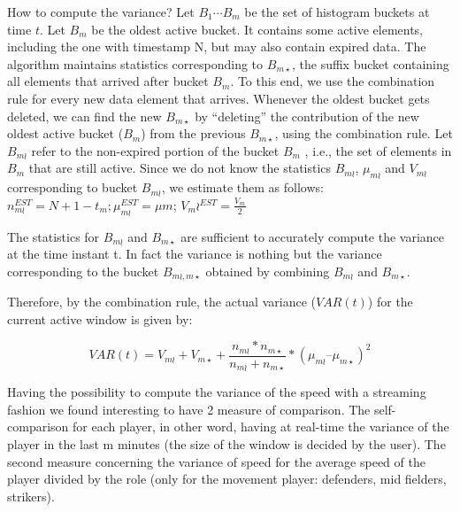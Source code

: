 \documentclass{acm_proc_article-sp-sigmod07}
\begin{document}
How to compute the variance? Let $B_1 \cdots B_m$ be the set of histogram buckets at time $t$. Let $B_m$ be the oldest active bucket. It contains some active elements, including the one with timestamp N, but may also contain expired data. The algorithm maintains statistics corresponding to $B_{m\star}$, the suffix bucket containing all elements that arrived after bucket $B_m$. To this end, we use the combination rule for every new data element that arrives. Whenever the oldest bucket gets deleted, we can find the new $B_{m\star}$ by “deleting” the contribution of the new oldest active bucket ($B_m$) from the previous $B_{m\star}$, using the combination rule. 
Let $B_{m\wr}$ refer to the non-expired portion of the bucket $B_m$ , i.e., the set of elements in $B_m$ that are still active. 
Since we do not know the statistics $B_{m\wr}$, $\mu_{m\wr}$  and $V_{m\wr}$ corresponding to bucket $B_{m\wr}$, we estimate them as follows: $n_{m\wr} ^{EST}= N + 1 - t_m; \mu_{m\wr} ^{EST} = \mu m $; $V_m{\wr} ^{EST} = \frac{V_m}{2}$ 

The statistics for $B_{m\wr}$ and $B_{m\star}$ are sufficient to accurately compute the variance at the time instant t. In fact the variance is nothing but the variance corresponding to the bucket $B_{m  \wr, m\star}$ obtained by combining $B_{m\wr}$ and $B_{m\star}$. 

Therefore, by the combination rule, the actual variance ($VAR(t)$) for the current active window is given by:


$$VAR(t) = V_{m\wr} + V_{m\star} + \frac{n_{m\wr}*n_{m\star}}{n_{m\wr}+n_{m\star}} *(\mu_{m\wr} – \mu_{m\star})^2$$

Having the possibility to compute the variance of the speed with a streaming fashion we found interesting to have 2 measure of comparison. The self-comparison for each player, in other word, having at real-time the variance of the player in the last m minutes (the size of the window is decided by the user). The second measure concerning the variance of speed for the average speed of the player divided by the role (only for the movement player: defenders, mid fielders, strikers). 
\end{document}
